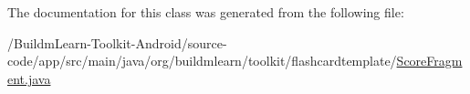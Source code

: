 The documentation for this class was generated from the following file\-:\begin{DoxyCompactItemize}
\item 
/\-Buildm\-Learn-\/\-Toolkit-\/\-Android/source-\/code/app/src/main/java/org/buildmlearn/toolkit/flashcardtemplate/\hyperlink{flashcardtemplate_2ScoreFragment_8java}{Score\-Fragment.\-java}\end{DoxyCompactItemize}
